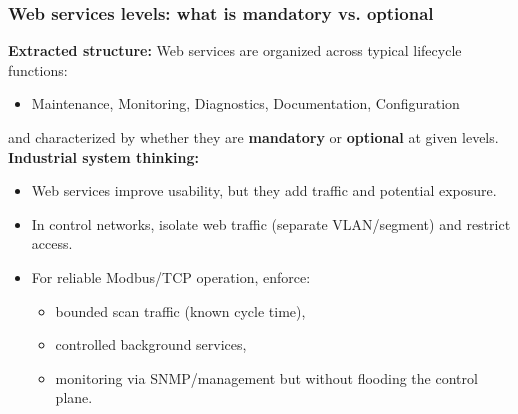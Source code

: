 \begin{frame}
	\frametitle{Web services levels: what is mandatory vs. optional}
	\small
	\textbf{Extracted structure:}
	Web services are organized across typical lifecycle functions:
	\begin{itemize}
		\item Maintenance, Monitoring, Diagnostics, Documentation, Configuration
	\end{itemize}
	and characterized by whether they are \textbf{mandatory} or \textbf{optional} at given levels.
	\vspace{0.6em}
	\textbf{Industrial system thinking:}
	\begin{itemize}
		\item Web services improve usability, but they add traffic and potential exposure.
		\item In control networks, isolate web traffic (separate VLAN/segment) and restrict access.
		\item For reliable Modbus/TCP operation, enforce:
		\begin{itemize}
			\item bounded scan traffic (known cycle time),
			\item controlled background services,
			\item monitoring via SNMP/management but without flooding the control plane.
		\end{itemize}
	\end{itemize}
\end{frame}

